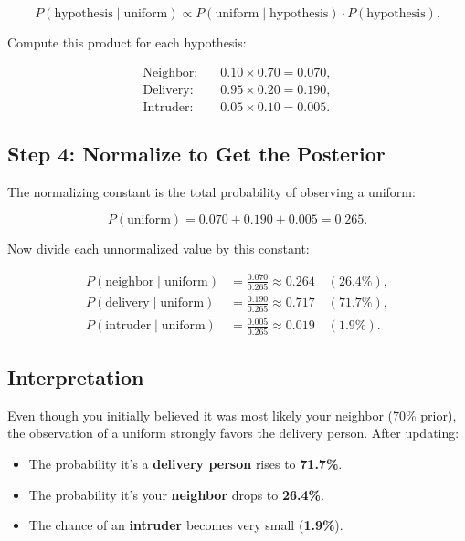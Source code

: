 \documentclass[11pt]{article}
\begin{document}
\[
P(\text{hypothesis} \mid \text{uniform}) \propto P(\text{uniform} \mid \text{hypothesis}) \cdot P(\text{hypothesis}).
\]

Compute this product for each hypothesis:

\begin{align*}
\text{Neighbor:}   &\quad 0.10 \times 0.70 = 0.070, \\
\text{Delivery:}   &\quad 0.95 \times 0.20 = 0.190, \\
\text{Intruder:}   &\quad 0.05 \times 0.10 = 0.005.
\end{align*}

\subsection*{Step 4: Normalize to Get the Posterior}

The normalizing constant is the total probability of observing a uniform:

\[
P(\text{uniform}) = 0.070 + 0.190 + 0.005 = 0.265.
\]

Now divide each unnormalized value by this constant:

\begin{align*}
P(\text{neighbor} \mid \text{uniform}) &= \frac{0.070}{0.265} \approx 0.264 \quad (26.4\%), \\
P(\text{delivery} \mid \text{uniform}) &= \frac{0.190}{0.265} \approx 0.717 \quad (71.7\%), \\
P(\text{intruder} \mid \text{uniform}) &= \frac{0.005}{0.265} \approx 0.019 \quad (1.9\%).
\end{align*}

\subsection*{Interpretation}

Even though you initially believed it was most likely your neighbor (70\% prior), the observation of a uniform strongly favors the delivery person. After updating:

\begin{itemize}
\item The probability it’s a \textbf{delivery person} rises to \textbf{71.7\%}.
    \item The probability it’s your \textbf{neighbor} drops to \textbf{26.4\%}.
    \item The chance of an \textbf{intruder} becomes very small (\textbf{1.9\%}).
\end{itemize}
\end{document}
